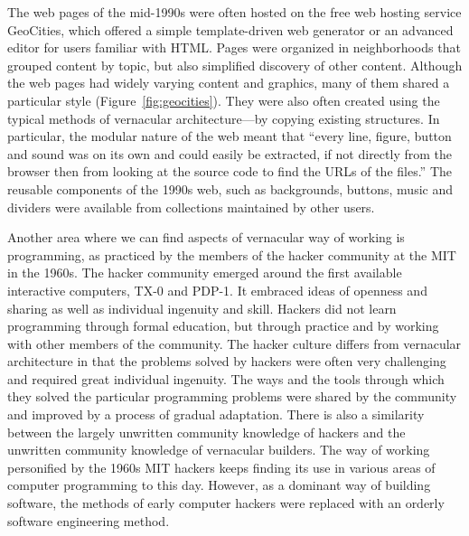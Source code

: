 The web pages of the mid-1990s were often hosted on the free web hosting service GeoCities, which
offered a simple template-driven web generator or an advanced editor for users familiar with HTML.
Pages were organized in neighborhoods that grouped content by topic, but also simplified discovery
of other content. Although the web pages had widely varying content and
graphics, many of them shared a particular style (Figure~\ref{fig:geocities}). They were also
often created using the typical methods of vernacular architecture---by copying existing structures.
In particular, the modular nature of the web meant that ``every line, figure, button and sound was
on its own and could easily be extracted, if not directly from the browser then from looking at the
source code to find the URLs of the files.'' The reusable components of the
1990s web, such as backgrounds, buttons, music and dividers were available from collections
maintained by other users.

Another area where we can find aspects of vernacular way of working is programming, as practiced
by the members of the hacker community at the MIT in the 1960s. The hacker community emerged around
the first available interactive computers, TX-0 and PDP-1. It embraced ideas of openness and
sharing as well as individual ingenuity and skill. Hackers did not learn programming
through formal education, but through practice and by working with other members of the community.
The hacker culture differs from vernacular architecture in that the problems solved by hackers
were often very challenging and required great individual ingenuity. The ways and the tools
through which they solved the particular programming problems were shared by the community
and improved by a process of gradual adaptation. There is also a
similarity between the largely unwritten community knowledge of hackers
and the unwritten community knowledge of vernacular builders. The way of working
personified by the 1960s MIT hackers keeps finding its use in various areas of computer programming
to this day. However, as a dominant way of building software,
the methods of early computer hackers were replaced with an orderly software engineering
method.

